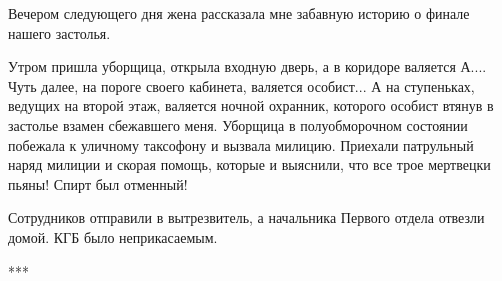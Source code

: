 Вечером следующего дня жена рассказала мне забавную историю о финале нашего
застолья.

Утром пришла уборщица, открыла входную дверь, а в коридоре валяется А.... Чуть
далее, на пороге своего кабинета, валяется особист... А на ступеньках, ведущих на
второй этаж, валяется ночной охранник, которого особист втянув в застолье
взамен сбежавшего меня. Уборщица в полуобморочном состоянии побежала к уличному
таксофону и вызвала милицию. Приехали патрульный наряд милиции и скорая помощь,
которые и выяснили, что все трое мертвецки пьяны! Спирт был отменный!

Сотрудников отправили в вытрезвитель, а начальника Первого отдела отвезли
домой. КГБ было неприкасаемым.

***

